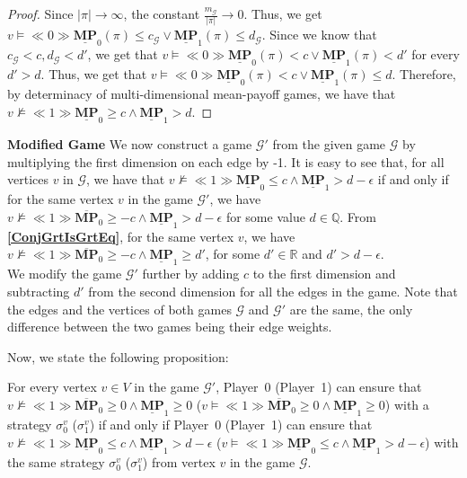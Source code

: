 \begin{proof}
    Since $|\pi| \to \infty$, the constant $\frac{m_\mathcal{G}}{|\pi|} \to 0$. Thus, we get $v \models \ll 0 \gg \underline{\mathbf{MP}}_0(\pi) \leqslant c_\mathcal{G} \lor \underline{\mathbf{MP}}_1(\pi) \leqslant d_\mathcal{G}$. Since we know that $c_\mathcal{G} < c, d_\mathcal{G} < d'$, we get that $v \models \ll 0 \gg \underline{\mathbf{MP}}_0(\pi) < c \lor \underline{\mathbf{MP}}_1(\pi) < d'$ for every $d' > d$. Thus, we get that  $v \models \ll 0 \gg \underline{\mathbf{MP}}_0(\pi) < c \lor \underline{\mathbf{MP}}_1(\pi) \leqslant d$. Therefore, by determinacy of multi-dimensional mean-payoff games, we have that $v \nvDash \ll 1 \gg \underline{\mathbf{MP}}_0 \geqslant c \land \underline{\mathbf{MP}}_1 > d$.
\end{proof}

\textbf{Modified Game} We now construct a game $\mathcal{G'}$ from the given game $\mathcal{G}$ by multiplying the first dimension on each edge by -1. It is easy to see that, for all vertices $v$ in $\mathcal{G}$, we have that $v \nvDash \ll 1 \gg \underline{\mathbf{MP}}_0 \leqslant c \land \underline{\mathbf{MP}}_1 > d-\epsilon$ if and only if for the same vertex $v$ in the game $\mathcal{G'}$, we have $v \nvDash \ll 1 \gg \overline{\mathbf{MP}}_0 \geqslant -c \land \underline{\mathbf{MP}}_1 > d-\epsilon$ for some value $d \in \mathbb{Q}$. From \textbf{\cref{ConjGrtIsGrtEq}}, for the same vertex $v$, we have $v \nvDash \ll 1 \gg \overline{\mathbf{MP}}_0 \geqslant -c \land \underline{\mathbf{MP}}_1 \geqslant d'$, for some $d' \in \mathbb{R}$ and $d' > d - \epsilon$. \\ \noindent
We modify the game $\mathcal{G'}$ further by adding $c$ to the first dimension and subtracting $d'$ from the second dimension for all the edges in the game. Note that the edges and the vertices of both games $\mathcal{G}$ and $\mathcal{G'}$ are the same, the only difference between the two games being their edge weights.

\noindent Now, we state the following proposition:
\begin{proposition}
    \label{PropGamStrEqNewGamStr}
    For every vertex $v \in V$ in the game $\mathcal{G'}$, Player~0 (Player~1) can ensure that $v \nvDash \ll 1 \gg \overline{\mathbf{MP}}_0 \geqslant 0 \land \underline{\mathbf{MP}}_1 \geqslant 0$ ($v \models \ll 1 \gg \overline{\mathbf{MP}}_0 \geqslant 0 \land \underline{\mathbf{MP}}_1 \geqslant 0$) with a strategy $\sigma_0^{v}$ ($\sigma_1^{v}$) if and only if Player~0 (Player~1) can ensure that $v \nvDash \ll 1 \gg \underline{\mathbf{MP}}_0 \leqslant c \land \underline{\mathbf{MP}}_1 > d-\epsilon$ ($v \models \ll 1 \gg \underline{\mathbf{MP}}_0 \leqslant c \land \underline{\mathbf{MP}}_1 > d-\epsilon$) with the same strategy $\sigma_0^{v}$ ($\sigma_1^{v}$) from vertex $v$ in the game $\mathcal{G}$.
\end{proposition}

